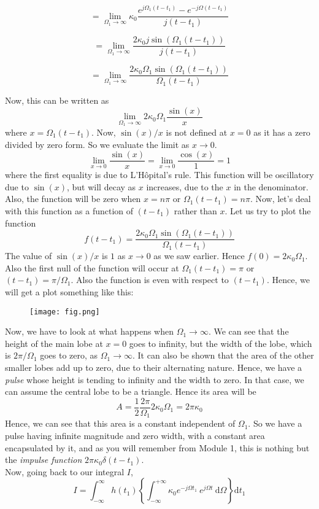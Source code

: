 \[
= \lim_{\Omega_1 \to \infty} \kappa_0 \frac{e^{j\Omega_1 (t-t_1)}-e^{-j\Omega (t-t_1)}}{j(t-t_1)}
\]

\[
= \lim_{\Omega_1 \to \infty}\frac{2\kappa_0 j\sin(\Omega_1 (t-t_1))}{j(t-t_1)}
\]

\[
= \lim_{\Omega_1 \to \infty}\frac{2\kappa_0\Omega_1\sin(\Omega_1 (t-t_1))}{\Omega_1(t-t_1)}
\]

Now, this can be written as 
\[
\lim_{\Omega_1 \to \infty} 2\kappa_0\Omega_1 \frac{\sin(x)}{x}
\]
where $x=\Omega_1(t-t_1)$. Now, $\sin(x)/x$ is not defined at $x=0$ as it has a zero divided by zero form. So we evaluate the limit as $x\to 0$.
\[
\lim_{x \to 0}\frac{\sin(x)}{x} = \lim_{x \to 0}\frac{\cos(x)}{1} = 1
\]
where the first equality is due to L'H\^opital's rule. This function will be oscillatory due to $\sin(x)$, but will decay as $x$ increases, due to the $x$ in the denominator. Also, the function will be zero when $x=n\pi$ or $\Omega_1(t-t_1)=n\pi$. Now, let's deal with this function as a function of $(t-t_1)$ rather than $x$. Let us try to plot the function
\[
f(t-t_1) = \frac{2\kappa_0\Omega_1\sin(\Omega_1 (t-t_1))}{\Omega_1(t-t_1)}
\]
The value of $\sin(x)/x$ is $1$ as $x \to 0$ as we saw earlier. Hence $f(0)=2\kappa_0\Omega_1$. Also the first null of the function will occur at $\Omega_1(t-t_1)=\pi$ or $(t-t_1)=\pi/\Omega_1$. Also the function is even with respect to $(t-t_1)$. Hence, we will get a plot something like this:
\begin{figure}[h!]
\texttt{[image: fig.png]}
\end{figure}
Now, we have to look at what happens when $\Omega_1 \to \infty$. We can see that the height of the main lobe at $x=0$ goes to infinity, but the width of the lobe, which is $2\pi/\Omega_1$ goes to zero, as $\Omega_1 \to \infty$. It can also be shown that the area of the other smaller lobes add up to zero, due to their alternating nature. Hence, we have a \emph{pulse} whose height is tending to infinity and the width to zero. In that case, we can assume the central lobe to be a triangle. Hence its area will be
\[
A = \frac{1}{2}\frac{2\pi}{\Omega_1}2\kappa_0\Omega_1 = 2\pi\kappa_0
\]
Hence, we can see that this area is a constant independent of $\Omega_1$. So we have a pulse having infinite magnitude and zero width, with a constant area encapsulated by it, and as you will remember from Module 1, this is nothing but the \emph{impulse function} $2\pi\kappa_0\delta(t-t_1)$.\\
Now, going back to our integral $I$,
\[
I = \int_{-\infty}^{\infty} \! h(t_1) \left\lbrace \int_{-\infty}^{+\infty} \! \kappa_0 e^{-j\Omega t_1} \  e^{j\Omega t} \ \mathrm{d}\Omega \right\rbrace \mathrm{d}t_1
\]

